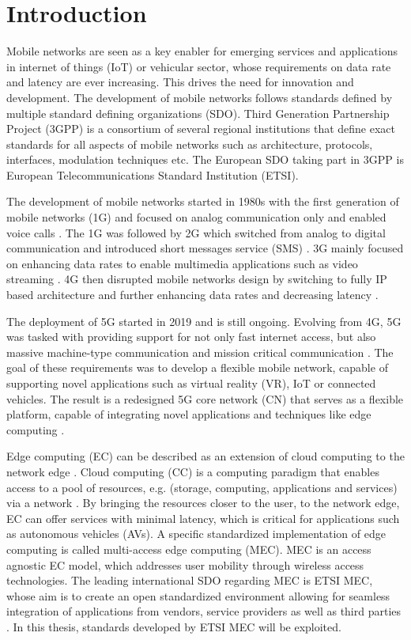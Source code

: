 \documentclass[12pt,a4paper,twoside]{report}
\begin{document}
\chapter{Introduction}
Mobile networks are seen as a key enabler for emerging services and applications in internet of things (IoT) or vehicular sector, whose requirements on data rate and latency are ever increasing. This drives the need for innovation and development. The development of mobile networks follows standards defined by multiple standard defining organizations (SDO). Third Generation Partnership Project (3GPP) is a consortium of several regional institutions that define exact standards for all aspects of mobile networks such as architecture, protocols, interfaces, modulation techniques etc. The European SDO taking part in 3GPP is European Telecommunications Standard Institution (ETSI). 

The development of mobile networks started in 1980s with the first generation of mobile networks (1G) and focused on analog communication only and enabled voice calls \cite{sauter2017history}. The 1G was followed by 2G which switched from analog to digital communication and introduced short messages service (SMS) \cite{sauter2017history}. 3G mainly focused on enhancing data rates to enable multimedia applications such as video streaming \cite{sauter2017history}. 4G then disrupted mobile networks design by switching to fully IP based architecture and further enhancing data rates and decreasing latency \cite{sauter2017history,dahlman20134g}. 

The deployment of 5G started in 2019 and is still ongoing. Evolving from 4G, 5G was tasked with providing support for not only fast internet access, but also massive machine-type communication and mission critical communication \cite{dahlman20205g}. The goal of these requirements was to develop a flexible mobile network, capable of supporting novel applications such as virtual reality (VR), IoT or connected vehicles. The result is a redesigned 5G core network (CN) that serves as a flexible platform, capable of integrating novel applications and techniques like edge computing \cite{sabella-mec-sw-dev}. 

Edge computing (EC) can be described as an extension of cloud computing to the network edge \cite{sabella-mec-sw-dev}. Cloud computing (CC) is a computing paradigm that enables access to a pool of resources, e.g. (storage, computing, applications and services) via a network \cite{mell2011nistCC}. By bringing the resources closer to the user, to the network edge, EC can offer services with minimal latency, which is critical for applications such as autonomous vehicles (AVs). A specific standardized implementation of edge computing is called multi-access edge computing (MEC). MEC is an access agnostic EC model, which addresses user mobility through wireless access technologies. The leading international SDO regarding MEC is ETSI MEC, whose aim is to create an open standardized environment allowing for seamless integration of applications from vendors, service providers as well as third parties \cite{etsi-web}.  In this thesis, standards developed by ETSI MEC will be exploited. 
\end{document}
